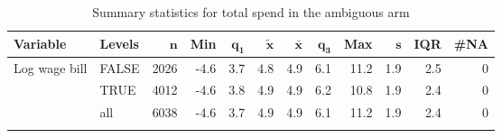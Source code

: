 {\footnotesize
\begin{longtable}{llrrrrrrrrrr}
\caption{Summary statistics for total spend in the ambiguous arm} \\ 
 \textbf{Variable} & \textbf{Levels} & $\mathbf{n}$ & \textbf{Min} & $\mathbf{q_1}$ & $\mathbf{\widetilde{x}}$ & $\mathbf{\bar{x}}$ & $\mathbf{q_3}$ & \textbf{Max} & $\mathbf{s}$ & \textbf{IQR} & \textbf{\#NA} \\ 
  \hline
Log wage bill & FALSE & 2026 & -4.6 & 3.7 & 4.8 & 4.9 & 6.1 & 11.2 & 1.9 & 2.5 & 0 \\ 
   & TRUE & 4012 & -4.6 & 3.8 & 4.9 & 4.9 & 6.2 & 10.8 & 1.9 & 2.4 & 0 \\ 
   \hline
 & all & 6038 & -4.6 & 3.7 & 4.9 & 4.9 & 6.1 & 11.2 & 1.9 & 2.4 & 0 \\ 
   \hline
\hline
\label{}
\end{longtable}
}
